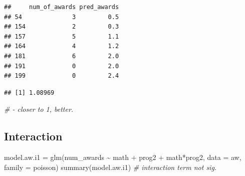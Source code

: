 \documentclass[
]{book}
\makeatletter
\newenvironment{Shaded}{\begin{snugshade}}{\end{snugshade}}
\newcommand{\AttributeTok}[1]{\textcolor[rgb]{0.61,0.61,0.61}{#1}}
\newcommand{\CommentTok}[1]{\textcolor[rgb]{0.37,0.37,0.37}{\textit{#1}}}
\newcommand{\FunctionTok}[1]{\textcolor[rgb]{0,0,0}{#1}}
\newcommand{\NormalTok}[1]{#1}
\newcommand{\OtherTok}[1]{\textcolor[rgb]{0.37,0.37,0.37}{#1}}
\newcommand{\SpecialCharTok}[1]{\textcolor[rgb]{0,0,0}{#1}}
\newenvironment{kframe}{%
\medskip{}
\setlength{\fboxsep}{.8em}
 \def\at@end@of@kframe{}%
 \ifinner\ifhmode%
  \def\at@end@of@kframe{\end{minipage}}%
  \begin{minipage}{\columnwidth}%
 \fi\fi%
 \def\FrameCommand##1{\hskip\@totalleftmargin \hskip-\fboxsep
 \colorbox{shadecolor}{##1}\hskip-\fboxsep
     \hskip-\linewidth \hskip-\@totalleftmargin \hskip\columnwidth}%
 \MakeFramed {\advance\hsize-\width
   \@totalleftmargin\z@ \linewidth\hsize
   \@setminipage}}%
 {\par\unskip\endMakeFramed%
 \at@end@of@kframe}
\renewenvironment{Shaded}{\begin{kframe}}{\end{kframe}}
\makeatother
\begin{document}
\begin{verbatim}
##     num_of_awards pred_awards
## 54              3         0.5
## 154             2         0.3
## 157             5         1.1
## 164             4         1.2
## 181             6         2.0
## 191             0         2.0
## 199             0         2.4
\end{verbatim}

\begin{Shaded}
\end{Shaded}

\begin{verbatim}
## [1] 1.08969
\end{verbatim}

\begin{Shaded}
\begin{Highlighting}[]
\CommentTok{\# {-} closer to 1, better.}
\end{Highlighting}
\end{Shaded}

\hypertarget{interaction-1}{%
\subsection{Interaction}\label{interaction-1}}

\begin{Shaded}
\begin{Highlighting}[]
\NormalTok{model.aw.i1 }\OtherTok{=} \FunctionTok{glm}\NormalTok{(num\_awards }\SpecialCharTok{\textasciitilde{}}\NormalTok{ math }\SpecialCharTok{+}\NormalTok{ prog2 }\SpecialCharTok{+}\NormalTok{ math}\SpecialCharTok{*}\NormalTok{prog2, }\AttributeTok{data =}\NormalTok{ aw, }\AttributeTok{family =}\NormalTok{ poisson)}
\FunctionTok{summary}\NormalTok{(model.aw.i1)  }\CommentTok{\# interaction term not sig.}
\end{Highlighting}
\end{Shaded}
\end{document}
